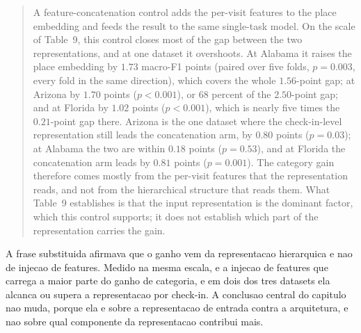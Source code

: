 \begin{quote}
A feature-concatenation control adds the per-visit features to the place embedding and feeds the
result to the same single-task model. On the scale of Table~9, this control closes most of the gap
between the two representations, and at one dataset it overshoots. At Alabama it raises the place
embedding by $1.73$ macro-F1 points (paired over five folds, $p = 0.003$, every fold in the same
direction), which covers the whole $1.56$-point gap; at Arizona by $1.70$ points ($p < 0.001$), or
$68$ percent of the $2.50$-point gap; and at Florida by $1.02$ points ($p < 0.001$), which is nearly
five times the $0.21$-point gap there. Arizona is the one dataset where the check-in-level
representation still leads the concatenation arm, by $0.80$ points ($p = 0.03$); at Alabama the two
are within $0.18$ points ($p = 0.53$), and at Florida the concatenation arm leads by $0.81$ points
($p = 0.001$). The category gain therefore comes mostly from the per-visit features that the
representation reads, and not from the hierarchical structure that reads them. What Table~9
establishes is that the input representation is the dominant factor, which this control supports; it
does not establish which part of the representation carries the gain.
\end{quote}

\noindent
A frase substituida afirmava que o ganho vem da representacao hierarquica e nao de injecao de
features. Medido na mesma escala, e a injecao de features que carrega a maior parte do ganho de
categoria, e em dois dos tres datasets ela alcanca ou supera a representacao por check-in. A
conclusao central do capitulo nao muda, porque ela e sobre a representacao de entrada contra a
arquitetura, e nao sobre qual componente da representacao contribui mais.
